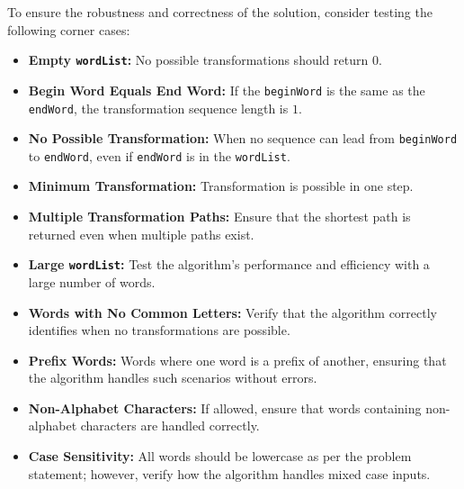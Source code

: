 To ensure the robustness and correctness of the solution, consider testing the following corner cases:

\begin{itemize}
    \item \textbf{Empty \texttt{wordList}:} No possible transformations should return \(0\).
    
    \item \textbf{Begin Word Equals End Word:} If the \texttt{beginWord} is the same as the \texttt{endWord}, the transformation sequence length is \(1\).
    
    \item \textbf{No Possible Transformation:} When no sequence can lead from \texttt{beginWord} to \texttt{endWord}, even if \texttt{endWord} is in the \texttt{wordList}.
    
    \item \textbf{Minimum Transformation:} Transformation is possible in one step.
    
    \item \textbf{Multiple Transformation Paths:} Ensure that the shortest path is returned even when multiple paths exist.
    
    \item \textbf{Large \texttt{wordList}:} Test the algorithm's performance and efficiency with a large number of words.
    
    \item \textbf{Words with No Common Letters:} Verify that the algorithm correctly identifies when no transformations are possible.
    
    \item \textbf{Prefix Words:} Words where one word is a prefix of another, ensuring that the algorithm handles such scenarios without errors.
    
    \item \textbf{Non-Alphabet Characters:} If allowed, ensure that words containing non-alphabet characters are handled correctly.
    
    \item \textbf{Case Sensitivity:} All words should be lowercase as per the problem statement; however, verify how the algorithm handles mixed case inputs.
\end{itemize}

\printindex